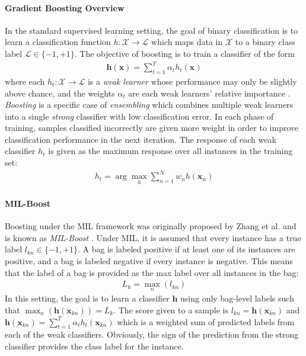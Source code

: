 \paragraph{Gradient Boosting Overview}
In the standard supervised learning setting, the goal of binary classification is to learn a classification function $h:\mathcal{X} \rightarrow \mathcal{L}$ which maps data in $\mathcal{X}$ to a binary class label $\mathcal{L} \in \{-1,+1\}$.  The objective of boosting is to train a classifier of the form
\begin{align}
	\bm{h}(\bm{x}) = \sum_{t=1}^{T}\alpha_{t}h_{t}(\bm{x})
\end{align}
\noindent
where each $h_{t}:\mathcal{X} \rightarrow \mathcal{L}$ is a \textit{weak learner} whose performance may only be slightly above chance, and the weights $\alpha_{t}$ are each weak learners' relative importance \citep{Babenko2008MIBoosting}.  \textit{Boosting} is a specific case of \textit{ensembling} which combines multiple weak learners into a single \textit{strong} classifier with low classification error.  In each phase of training, samples classified incorrectly are given more weight in order to improve classification performance in the next iteration.  The response of each weak classifier $h_{t}$ is given as the maximum response over all instances in the training set:
\begin{align}
	h_{t} = \arg \max_{h} \sum_{n=1}^{N}w_{n}h(\bm{x}_{n})
\end{align}

\paragraph{MIL-Boost}
Boosting under the MIL framework was originally proposed by Zhang et al. and is known as \textit{MIL-Boost} \citep{Zhang2006MIBoosting}.  Under MIL, it is assumed that every instance has a true label $l_{kn} \in \{ -1,+1 \}$.  A bag is labeled positive if at least one of its instances are positive, and a bag is labeled negative if every instance is negative.  This means that the label of a bag is provided as the max label over all instances in the bag:
\begin{align}
	L_{k} = \max_{n}(l_{kn})
\end{align}
\noindent
In this setting, the goal is to learn a classifier $\bm{h}$ using only bag-level labels such that $\max_{n}(\bm{h}(\bm{x}_{kn})) = L_{k}$. The score given to a sample is $l_{kn} = \bm{h}(\bm{x}_{kn})$ and $\bm{h}(\bm{x}_{kn}) = \sum_{t=1}^{T}\alpha_{t}h_{t}(\bm{x}_{kn})$ which is a weighted sum of predicted labels from each of the weak classifiers.  Obviously, the sign of the prediction from the strong classifier provides the class label for the instance.

